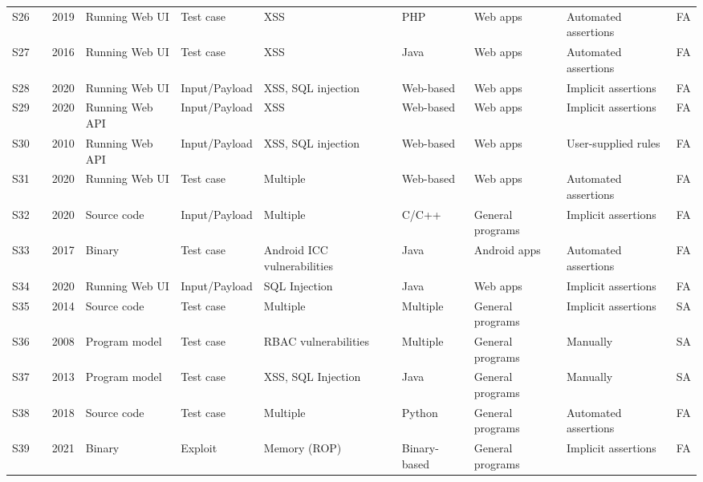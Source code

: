 \begin{table}[t]
{\begin{tabular}{|lp{0.5cm}p{0.5cm}lllllll|}
\midrule

S26 & \cite{Simos2019122}  &  2019  & Running Web UI &   Test case  &   XSS &  PHP  &  Web apps  &  Automated assertions  &   FA   \\
S27 & \cite{Mohammadi201678}  &  2016  & Running Web UI &   Test case  &   XSS &  Java  &  Web apps  &  Automated assertions  &   FA   \\
S28 & \cite{Bozic202020}  &  2020  & Running Web UI &   Input/Payload  &   XSS, SQL injection &  Web-based  &  Web apps  &  Implicit assertions  &   FA   \\
S29 & \cite{Bozic2020115}  &  2020  & Running Web API &   Input/Payload  &   XSS &  Web-based  &  Web apps  &  Implicit assertions  &   FA   \\
S30 & \cite{zhang2010d}  &  2010  & Running Web API &   Input/Payload  &   XSS, SQL injection &  Web-based  &  Web apps  &  User-supplied rules  &   FA   \\
S31 & \cite{Chaleshtari20233430}  &  2020  & Running Web UI &   Test case  &   Multiple &  Web-based  &  Web apps  &  Automated assertions  &   FA   \\
S32 & \cite{Chen20201580}  &  2020  & Source code &   Input/Payload  &   Multiple &  C/C++  &  General programs  & Implicit assertions  &   FA   \\
S33 & \cite{Tang2017492}  &  2017  & Binary &   Test case  &   Android ICC vulnerabilities &  Java  &  Android apps  & Automated assertions  &   FA   \\
S34 & \cite{Liu2020286}  &  2020  & Running Web UI &   Input/Payload  &   SQL Injection &  Java  &  Web apps  & Implicit assertions  &   FA   \\
S35 & \cite{Zech201488}  &  2014  & Source code &   Test case  &   Multiple &  Multiple  &  General programs  & Implicit assertions  &   SA   \\
S36 & \cite{Pretschner2008338}  &  2008  & Program model &   Test case  &   RBAC vulnerabilities &  Multiple  &  General programs  & Manually  &   SA   \\
S37 & \cite{Lebeau2013445}  &  2013  & Program model &   Test case  &   XSS,  SQL Injection &  Java  &  General programs  & Manually &   SA   \\
S38 & \cite{Siavashi2018301}  &  2018  & Source code &   Test case  &   Multiple &  Python  &  General programs  & Automated assertions &   FA   \\
S39 & \cite{Nurmukhametov202137}  &  2021  & Binary &   Exploit  &   Memory (ROP) &  Binary-based  &  General programs  & Implicit assertions &   FA   \\

\end{tabular}}
\end{table}
